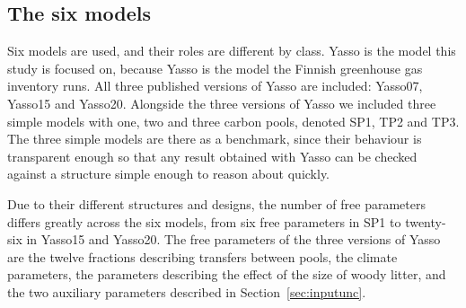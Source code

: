 \documentclass[11pt]{article}
\begin{document}
\subsection{The six models}\label{sec:models}

Six models are used, and their roles are different by class. 
Yasso is the model this
study is focused on, because Yasso is the model the Finnish greenhouse gas
inventory runs. All three published versions of Yasso are included: Yasso07,
Yasso15 and Yasso20. 
Alongside the three versions of Yasso we included three simple
models with one, two and three carbon pools, denoted SP1, TP2 and TP3. The three
simple models are there as a benchmark, since their behaviour is transparent enough so that any result obtained with Yasso can be checked against a
structure simple enough to reason about quickly.

Due to their different structures and designs, the number of free parameters differs greatly across the six models, from six free
parameters in SP1 to twenty-six in Yasso15 and Yasso20. The free parameters of the
three versions of Yasso are the twelve fractions describing transfers between
pools, the climate parameters, the parameters describing the effect of the size of
woody litter, and the two auxiliary parameters described in Section~\ref{sec:inputunc}. 
\end{document}
